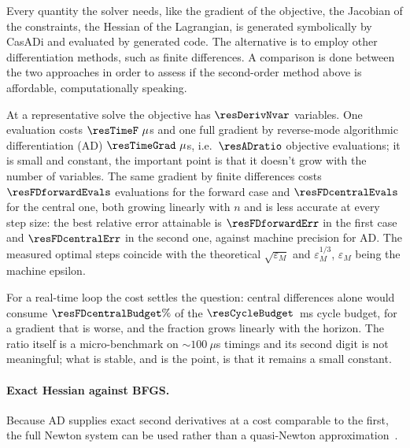 \documentclass[11pt,a4paper]{article}
\begin{document}
Every quantity the solver needs, like the gradient of the objective, the Jacobian of the constraints, the
Hessian of the Lagrangian, is generated symbolically by CasADi and evaluated by generated code. The
alternative is to employ other differentiation methods, such as finite differences. A comparison is done between the two approaches in order to assess if the
second-order method above is affordable, computationally speaking.

\begin{table}[htbp]
  \centering
  \small
  \caption{%
  Accuracy of the finite-difference gradient against the step size, measured against the AD gradient. The
  optimum sits at $h=1.49\times 10^{-8}$ forward (theory: $\sqrt{\varepsilon_M}=1.49\times 10^{-8}$) and
  $h=6.06\times 10^{-6}$ central (theory: $\varepsilon_M^{1/3}=6.06\times 10^{-6}$).}
  \label{res:tab:fd}
\end{table}

At a representative solve the objective has $\resDerivNvar$ variables. One evaluation costs
$\resTimeF~\mu$s and one full gradient by reverse-mode algorithmic differentiation (AD) $\resTimeGrad~\mu$s,
i.e.\ $\resADratio$ objective evaluations; it is small and constant, the important point is that it doesn't grow with the
number of variables. The same gradient by finite differences costs $\resFDforwardEvals$ evaluations for the forward case
and $\resFDcentralEvals$ for the central one, both growing linearly with $n$ and is less accurate at every step size:
the best relative error attainable is $\resFDforwardErr$ in the first case and $\resFDcentralErr$ in the second one, against 
machine precision for AD. The measured optimal steps coincide with the theoretical $\sqrt{\varepsilon_M}$ and 
$\varepsilon_M^{1/3}$, $\varepsilon_M$ being the machine epsilon.

For a real-time loop the cost settles the question: central differences alone would consume
$\resFDcentralBudget\%$ of the $\resCycleBudget$~ms cycle budget, for a gradient that is worse, and the
fraction grows linearly with the horizon. The ratio itself is a micro-benchmark on
$\sim\!100~\mu$s timings and its second digit is not meaningful; what is stable, and is the point, is that it
remains a small constant.

\paragraph{Exact Hessian against BFGS.} Because AD supplies exact second derivatives at a cost
comparable to the first, the full Newton system can be used rather than a quasi-Newton approximation~\cite{fagiano2025noc}.
\end{document}
